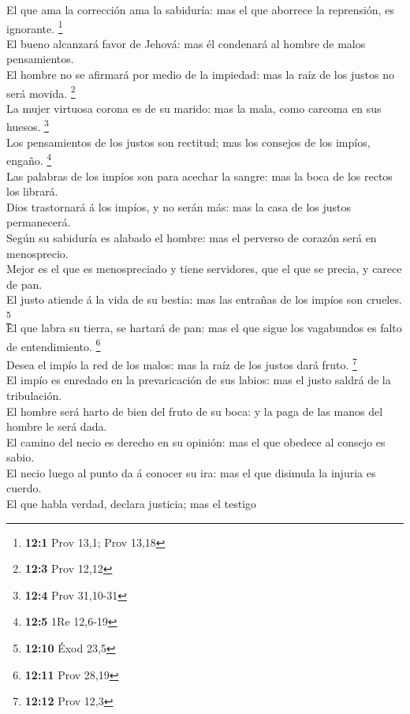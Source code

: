  El que ama la corrección ama la sabiduría: mas el que
aborrece la reprensión, es ignorante. \footnote{\textbf{12:1} Prov 13,1;
  Prov 13,18}\\
 El bueno alcanzará favor de Jehová: mas él condenará al
hombre de malos pensamientos.\\
 El hombre no se afirmará por medio de la impiedad: mas la
raíz de los justos no será movida. \footnote{\textbf{12:3} Prov 12,12}\\
 La mujer virtuosa corona es de su marido: mas la mala, como
carcoma en sus huesos. \footnote{\textbf{12:4} Prov 31,10-31}\\
 Los pensamientos de los justos son rectitud; mas los
consejos de los impíos, engaño. \footnote{\textbf{12:5} 1Re 12,6-19}\\
 Las palabras de los impíos son para acechar la sangre: mas
la boca de los rectos los librará.\\
 Dios trastornará á los impíos, y no serán más: mas la casa
de los justos permanecerá.\\
 Según su sabiduría es alabado el hombre: mas el perverso de
corazón será en menosprecio.\\
 Mejor es el que es menospreciado y tiene servidores, que el
que se precia, y carece de pan.\\
 El justo atiende á la vida de su bestia: mas las entrañas
de los impíos son crueles. \footnote{\textbf{12:10} Éxod 23,5}\\
 El que labra su tierra, se hartará de pan: mas el que
sigue los vagabundos es falto de entendimiento. \footnote{\textbf{12:11}
  Prov 28,19}\\
 Desea el impío la red de los malos: mas la raíz de los
justos dará fruto. \footnote{\textbf{12:12} Prov 12,3}\\
 El impío es enredado en la prevaricación de sus labios:
mas el justo saldrá de la tribulación.\\
 El hombre será harto de bien del fruto de su boca: y la
paga de las manos del hombre le será dada.\\
 El camino del necio es derecho en su opinión: mas el que
obedece al consejo es sabio.\\
 El necio luego al punto da á conocer su ira: mas el que
disimula la injuria es cuerdo.\\
 El que habla verdad, declara justicia; mas el testigo
